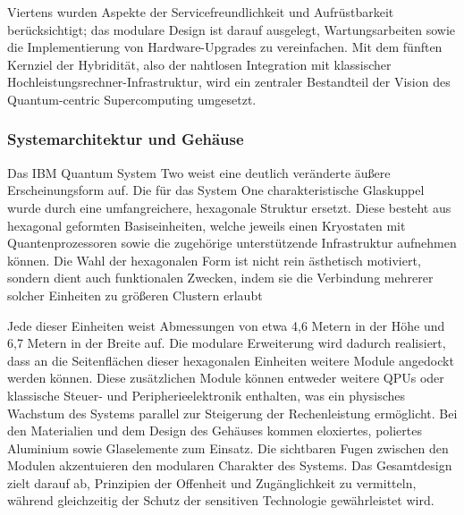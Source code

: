 Viertens wurden Aspekte der Servicefreundlichkeit und Aufrüstbarkeit berücksichtigt; das modulare Design ist darauf ausgelegt, Wartungsarbeiten sowie die Implementierung von Hardware-Upgrades zu vereinfachen. Mit dem fünften Kernziel der Hybridität, also der nahtlosen Integration mit klassischer Hochleistungsrechner-Infrastruktur, wird ein zentraler Bestandteil der Vision des Quantum-centric Supercomputing umgesetzt.

\subsubsection{Systemarchitektur und Gehäuse}
Das IBM Quantum System Two weist eine deutlich veränderte äußere Erscheinungsform auf. Die für das System One charakteristische Glaskuppel wurde durch eine umfangreichere, hexagonale Struktur ersetzt. Diese besteht aus hexagonal geformten Basiseinheiten, welche jeweils einen Kryostaten mit Quantenprozessoren sowie die zugehörige unterstützende Infrastruktur aufnehmen können. Die Wahl der hexagonalen Form ist nicht rein ästhetisch motiviert, sondern dient auch funktionalen Zwecken, indem sie die Verbindung mehrerer solcher Einheiten zu größeren Clustern erlaubt 

Jede dieser Einheiten weist Abmessungen von etwa 4,6 Metern in der Höhe und 6,7 Metern in der Breite auf. Die modulare Erweiterung wird dadurch realisiert, dass an die Seitenflächen dieser hexagonalen Einheiten weitere Module angedockt werden können. Diese zusätzlichen Module können entweder weitere QPUs oder klassische Steuer- und Peripherieelektronik enthalten, was ein physisches Wachstum des Systems parallel zur Steigerung der Rechenleistung ermöglicht. Bei den Materialien und dem Design des Gehäuses kommen eloxiertes, poliertes Aluminium sowie Glaselemente zum Einsatz. Die sichtbaren Fugen zwischen den Modulen akzentuieren den modularen Charakter des Systems.
Das Gesamtdesign zielt darauf ab, Prinzipien der Offenheit und Zugänglichkeit zu vermitteln, während gleichzeitig der Schutz der sensitiven Technologie gewährleistet wird.

